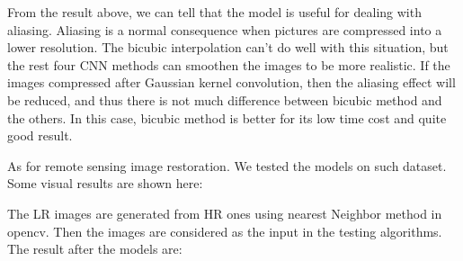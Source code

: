 \documentclass{article}
\begin{document}
  From the result above, we can tell that the model is useful for dealing with aliasing.
  Aliasing is a normal consequence when pictures are compressed into a lower resolution.
  The bicubic interpolation can't do well with this situation, 
  but the rest four CNN methods can smoothen the images to be more realistic.
  If the images compressed after Gaussian kernel convolution,
  then the aliasing effect will be reduced, and thus there is not much difference between bicubic method and the others.
  In this case, bicubic method is better for its low time cost and quite good result.
  
  As for remote sensing image restoration.
  We tested the models on such dataset. 
  Some visual results are shown here:

  The LR images are generated from HR ones using nearest Neighbor method in opencv.
  Then the images are considered as the input in the testing algorithms.
  The result after the models are:
\end{document}
